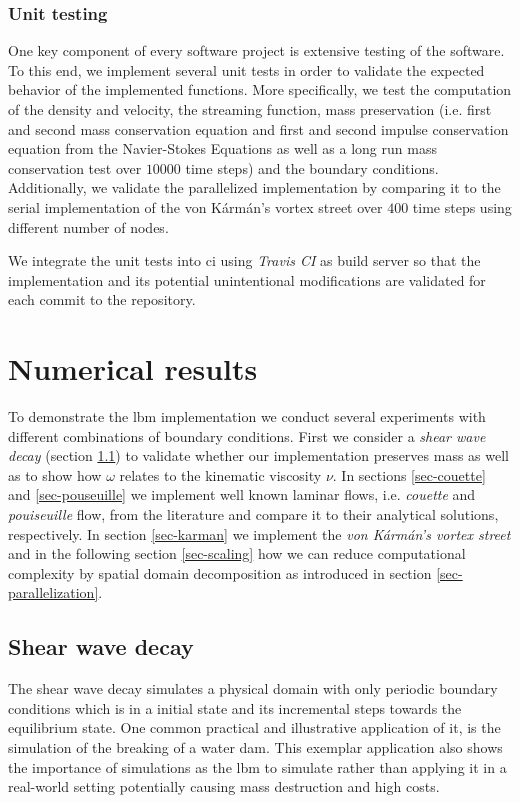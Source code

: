 \documentclass[a4paper,11pt, footsepline]{book}
\begin{document}
\subsection*{Unit testing}
One key component of every software project is extensive testing of the software. To this end, we implement several unit tests in order to validate the expected behavior of the implemented functions. 
More specifically, we test the computation of the density and velocity, the streaming function, mass preservation (i.e. first and second mass conservation equation and first and second impulse conservation equation from the Navier-Stokes Equations as well as a long run mass conservation test over $10000$ time steps) and the boundary conditions.
Additionally, we validate the parallelized implementation by comparing it to the serial implementation of the von K\'{a}rm\'{a}n's vortex street over $400$ time steps using different number of nodes. 

We integrate the unit tests into \ac{ci} using \textit{Travis CI} as build server so that the implementation and its potential unintentional modifications are validated for each commit to the repository.
\chapter{Numerical results}\label{ch-results}
To demonstrate the \ac{lbm} implementation we conduct several experiments with different combinations of boundary conditions. First we consider a \textit{shear wave decay} (section \ref{sec-shearWave}) to validate whether our implementation preserves mass as well as to show how $\omega$ relates to the kinematic viscosity $\nu$. In sections \ref{sec-couette} and \ref{sec-pouseuille} we implement well known laminar flows, i.e. \textit{couette} and \textit{pouiseuille} flow, from the literature and compare it to their analytical solutions, respectively. In section \ref{sec-karman} we implement the \textit{von K\'{a}rm\'{a}n's vortex street} and in the following section \ref{sec-scaling} how we can reduce computational complexity by spatial domain decomposition as introduced in section \ref{sec-parallelization}.
\section{Shear wave decay}\label{sec-shearWave}
The shear wave decay simulates a physical domain with only periodic boundary conditions which is in a initial state and its incremental steps towards the equilibrium state. One common practical and illustrative application of it, is the simulation of the breaking of a water dam. This exemplar application also shows the importance of simulations as the \ac{lbm} to simulate rather than applying it in a real-world setting potentially causing mass destruction and high costs.
\end{document}
